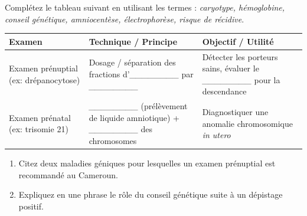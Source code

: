 \documentclass[11pt]{article}
\begin{document}
\begin{exercice}
Complétez le tableau suivant en utilisant les termes : \textit{caryotype, hémoglobine, conseil génétique, amniocentèse, électrophorèse, risque de récidive}.
\begin{center}
\begin{tabularx}{\linewidth}{|X|X|X|}
\hline
\textbf{Examen} & \textbf{Technique / Principe} & \textbf{Objectif / Utilité} \\
\hline
Examen prénuptial (ex: drépanocytose) & Dosage / séparation des fractions d'\textit{\_\_\_\_\_\_\_\_} par \textit{\_\_\_\_\_\_\_\_} & Détecter les porteurs sains, évaluer le \textit{\_\_\_\_\_\_\_\_} pour la descendance \\
\hline
Examen prénatal (ex: trisomie 21) & \textit{\_\_\_\_\_\_\_\_} (prélèvement de liquide amniotique) + \textit{\_\_\_\_\_\_\_\_} des chromosomes & Diagnostiquer une anomalie chromosomique \textit{in utero} \\
\hline
\end{tabularx}
\end{center}
\begin{enumerate}
    \item Citez deux maladies géniques pour lesquelles un examen prénuptial est recommandé au Cameroun.
    \item Expliquez en une phrase le rôle du conseil génétique suite à un dépistage positif.
\end{enumerate}
\end{exercice}
\end{document}
